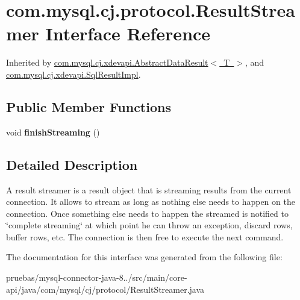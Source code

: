 \hypertarget{interfacecom_1_1mysql_1_1cj_1_1protocol_1_1_result_streamer}{}\section{com.\+mysql.\+cj.\+protocol.\+Result\+Streamer Interface Reference}
\label{interfacecom_1_1mysql_1_1cj_1_1protocol_1_1_result_streamer}


Inherited by \mbox{\hyperlink{classcom_1_1mysql_1_1cj_1_1xdevapi_1_1_abstract_data_result}{com.\+mysql.\+cj.\+xdevapi.\+Abstract\+Data\+Result$<$ T $>$}}, and \mbox{\hyperlink{classcom_1_1mysql_1_1cj_1_1xdevapi_1_1_sql_result_impl}{com.\+mysql.\+cj.\+xdevapi.\+Sql\+Result\+Impl}}.

\subsection*{Public Member Functions}
\begin{DoxyCompactItemize}
\item 
\mbox{\label{interfacecom_1_1mysql_1_1cj_1_1protocol_1_1_result_streamer_a58007e9c29f81c5e681f3df64fc4a055}} 
void {\bfseries finish\+Streaming} ()
\end{DoxyCompactItemize}


\subsection{Detailed Description}
A result streamer is a result object that is streaming results from the current connection. It allows to stream as long as nothing else needs to happen on the connection. Once something else needs to happen the streamed is notified to \char`\"{}complete streaming\char`\"{} at which point he can throw an exception, discard rows, buffer rows, etc. The connection is then free to execute the next command. 

The documentation for this interface was generated from the following file\+:\begin{DoxyCompactItemize}
\item 
pruebas/mysql-\/connector-\/java-\/8../src/main/core-\/api/java/com/mysql/cj/protocol/Result\+Streamer.\+java\end{DoxyCompactItemize}

